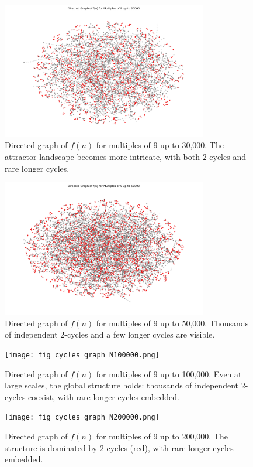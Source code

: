 \documentclass[12pt]{article}
\begin{document}
\begin{figure}[h!]
    \centering
    \includegraphics[width=0.8\textwidth]{fig_cycles_graph_N30000.png}
    \caption{Directed graph of $f(n)$ for multiples of 9 up to 30,000. The attractor landscape becomes more intricate, with both 2-cycles and rare longer cycles.}
\end{figure}

\begin{figure}[h!]
    \centering
    \includegraphics[width=0.8\textwidth]{fig_cycles_graph_N50000.png}
    \caption{Directed graph of $f(n)$ for multiples of 9 up to 50,000. Thousands of independent 2-cycles and a few longer cycles are visible.}
\end{figure}

\begin{figure}[h!]
    \centering
    \texttt{[image: fig\_cycles\_graph\_N100000.png]}
    \caption{Directed graph of $f(n)$ for multiples of 9 up to 100,000. Even at large scales, the global structure holds: thousands of independent 2-cycles coexist, with rare longer cycles embedded.}
\end{figure}

\begin{figure}[h!]
    \centering
    \texttt{[image: fig\_cycles\_graph\_N200000.png]}
    \caption{Directed graph of $f(n)$ for multiples of 9 up to 200,000. The structure is dominated by 2-cycles (red), with rare longer cycles embedded.}
    \label{fig:cycles_graph_N200000}
\end{figure}
\end{document}
